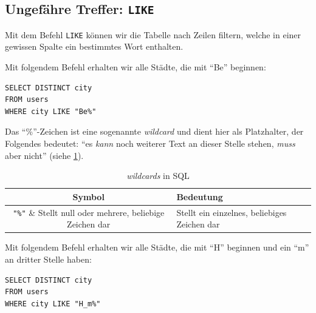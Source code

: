 \subsection{Ungefähre Treffer: \texorpdfstring{\lstinline|LIKE|}{LIKE}}

Mit dem Befehl \lstinline|LIKE| können wir die Tabelle nach Zeilen filtern, welche in einer gewissen Spalte ein bestimmtes Wort enthalten.

\begin{myexample}
Mit folgendem Befehl erhalten wir alle Städte, die mit \enquote{Be} beginnen:

\begin{lstlisting}
SELECT DISTINCT city 
FROM users 
WHERE city LIKE "Be%"
\end{lstlisting}
\end{myexample}

Das \enquote{\%}-Zeichen ist eine sogenannte \textit{wildcard} und dient hier als Platzhalter, der Folgendes bedeutet: \enquote{es \textit{kann} noch weiterer Text an dieser Stelle stehen, \textit{muss} aber nicht} (siehe \cref{table:wildcards}).

\begin{table}[ht]
  \centering
  \begin{tabular}{c|l}
    \textbf{Symbol}            & \textbf{Bedeutung}                              \\ \midrule
    \lstinline|"%"| & Stellt null oder mehrere, beliebige Zeichen dar \\ \hline
    \lstinline|"_"| & Stellt ein einzelnes, beliebiges Zeichen dar    \\
  \end{tabular}
  \caption{\textit{wildcards} in \gls{SQL}}
  \label{table:wildcards}
\end{table}

\begin{myexample}
Mit folgendem Befehl erhalten wir alle Städte, die mit \enquote{H} beginnen und ein \enquote{m} an dritter Stelle haben:

\begin{lstlisting}
SELECT DISTINCT city 
FROM users 
WHERE city LIKE "H_m%"
\end{lstlisting}
\end{myexample}



